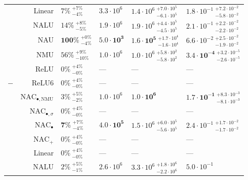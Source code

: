 \begin{longtable}{crllll}
 & Linear & $7\% {~}^{+7\%}_{-4\%}$ & $3.3 \cdot 10^{6}$ & $1.4 \cdot 10^{6} {~}^{+7.0 \cdot 10^{5}}_{-6.1 \cdot 10^{5}}$ & $1.8 \cdot 10^{-1} {~}^{+7.2 \cdot 10^{-2}}_{-5.8 \cdot 10^{-2}}$\\

 & NALU & $14\% {~}^{+8\%}_{-5\%}$ & $1.9 \cdot 10^{6}$ & $1.9 \cdot 10^{6} {~}^{+4.4 \cdot 10^{5}}_{-4.5 \cdot 10^{5}}$ & $2.1 \cdot 10^{-1} {~}^{+2.2 \cdot 10^{-2}}_{-2.2 \cdot 10^{-2}}$\\

 & NAU & $\mathbf{100\%} {~}^{+0\%}_{-4\%}$ & $\mathbf{5.0 \cdot 10^{3}}$ & $\mathbf{1.6 \cdot 10^{5}} {~}^{+1.7 \cdot 10^{4}}_{-1.6 \cdot 10^{4}}$ & $6.6 \cdot 10^{-2} {~}^{+2.5 \cdot 10^{-2}}_{-1.9 \cdot 10^{-2}}$\\

 & NMU & $56\% {~}^{+9\%}_{-10\%}$ & $1.0 \cdot 10^{6}$ & $1.0 \cdot 10^{6} {~}^{+5.8 \cdot 10^{2}}_{-5.8 \cdot 10^{2}}$ & $\mathbf{3.4 \cdot 10^{-4}} {~}^{+3.2 \cdot 10^{-5}}_{-2.6 \cdot 10^{-5}}$\\

 & ReLU & $0\% {~}^{+4\%}_{-0\%}$ & --- & --- & ---\\

\multirow{-10}{*}{\centering\arraybackslash $\bm{-}$} & ReLU6 & $0\% {~}^{+4\%}_{-0\%}$ & --- & --- & ---\\
\cmidrule{1-6}
 & $\mathrm{NAC}_{\bullet,\mathrm{NMU}}$ & $3\% {~}^{+5\%}_{-2\%}$ & $1.0 \cdot 10^{6}$ & $\mathbf{1.0 \cdot 10^{6}}$ & $\mathbf{1.7 \cdot 10^{-1}} {~}^{+8.3 \cdot 10^{-3}}_{-8.1 \cdot 10^{-3}}$\\

 & $\mathrm{NAC}_{\bullet,\sigma}$ & $0\% {~}^{+4\%}_{-0\%}$ & --- & --- & ---\\

 & $\mathrm{NAC}_{\bullet}$ & $\mathbf{7\%} {~}^{+7\%}_{-4\%}$ & $\mathbf{4.0 \cdot 10^{5}}$ & $1.5 \cdot 10^{6} {~}^{+6.0 \cdot 10^{5}}_{-5.6 \cdot 10^{5}}$ & $2.4 \cdot 10^{-1} {~}^{+1.7 \cdot 10^{-2}}_{-1.7 \cdot 10^{-2}}$\\

 & $\mathrm{NAC}_{+}$ & $0\% {~}^{+4\%}_{-0\%}$ & --- & --- & ---\\

 & Linear & $0\% {~}^{+4\%}_{-0\%}$ & --- & --- & ---\\

 & NALU & $2\% {~}^{+5\%}_{-1\%}$ & $2.6 \cdot 10^{6}$ & $3.3 \cdot 10^{6} {~}^{+1.8 \cdot 10^{6}}_{-2.2 \cdot 10^{6}}$ & $5.0 \cdot 10^{-1}$\\


\end{longtable}
